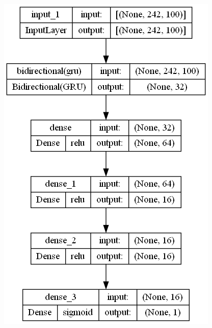 \documentclass{article}
\begin{document}
\begin{figure}[!h]
    \centering\includegraphics[scale=.45]{./GRU-[16]}
    \caption{}\label{fig.47}
\end{figure}
\end{document}
